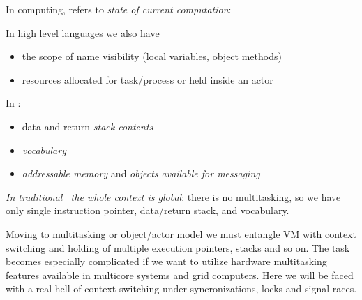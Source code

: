 \label{context}

In computing,  refers to \emph{state of current computation}:
In high level languages we also have
\begin{itemize}[nosep]
  \item the scope of name visibility (local variables, object methods)
  \item resources allocated for task/process or held inside an actor
\end{itemize}
In \F:
\begin{itemize}[nosep]
  \item data and return \emph{stack contents}
  \item \emph{vocabulary}
  \item \emph{addressable memory} and \textit{objects available for messaging}
\end{itemize}

\clearpage\noindent
\emph{In traditional \F\ the whole context is global}: there is no multitasking,
so we have only single instruction pointer, data/return stack, and
vocabulary.

Moving to multitasking or object/actor model we must entangle VM with context
switching and holding of multiple execution pointers, stacks and so on. The task
becomes especially complicated if we want to utilize hardware multitasking
features available in multicore systems and grid computers. Here we will be
faced with a real hell of context switching under syncronizations, locks and
signal races.
